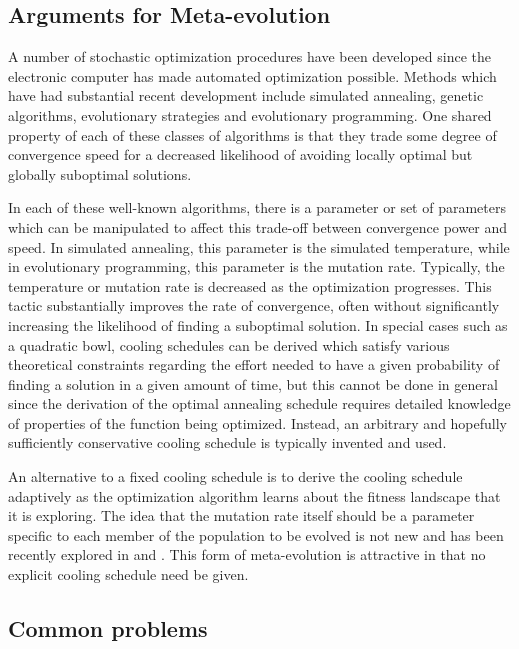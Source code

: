 \documentclass[12pt, titlepage]{article}
\begin{document}
\subsection{Arguments for Meta-evolution}

A number of stochastic optimization procedures have been developed
since the electronic computer has made automated optimization
possible.  Methods which have had substantial recent development
include simulated annealing, genetic algorithms, evolutionary
strategies and evolutionary programming.  One shared property of each
of these classes of algorithms is that they trade some degree of
convergence speed for a decreased likelihood of avoiding locally
optimal but globally suboptimal solutions.

In each of these well-known algorithms, there is a parameter or set of
parameters which can be manipulated to affect this trade-off between
convergence power and speed.  In simulated annealing, this parameter
is the simulated temperature, while in evolutionary programming, this
parameter is the mutation rate.  Typically, the temperature or
mutation rate is decreased as the optimization progresses.  This
tactic substantially improves the rate of convergence, often without
significantly increasing the likelihood of finding a suboptimal
solution.  In special cases such as a quadratic bowl, cooling
schedules can be derived which satisfy various theoretical constraints
regarding the effort needed to have a given probability of finding a
solution in a given amount of time, but this cannot be done in general
since the derivation of the optimal annealing schedule requires
detailed knowledge of properties of the function being optimized.
Instead, an arbitrary and hopefully sufficiently conservative cooling
schedule is typically invented and used.

An alternative to a fixed cooling schedule is to derive the cooling
schedule adaptively as the optimization algorithm learns about the
fitness landscape that it is exploring.  The idea that the mutation
rate itself should be a parameter specific to each member of the
population to be evolved is not new and has been recently explored in
\cite{fogel92} and \cite{fogel}.  This form of meta-evolution is
attractive in that no explicit cooling schedule need be given.

\subsection{Common problems}
\end{document}

